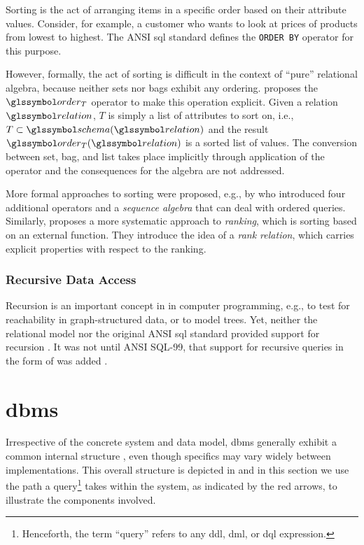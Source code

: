 Sorting is the act of arranging items in a specific order based on their attribute values. Consider, for example, a customer who wants to look at prices of products from lowest to highest. The ANSI \acrshort{sql} standard \cite{XOpen:1996SQL} defines the \texttt{ORDER BY} operator for this purpose.

However, formally, the act of sorting is difficult in the context of ``pure'' relational algebra, because neither sets nor bags exhibit any ordering. \cite{Garcia:2009Database} proposes the $\order_T$ operator to make this operation explicit. Given a relation $\relation$, $T$ is simply a list of attributes to sort on, i.e., $T \subset \schema(\relation)$ and the result $\order_T (\relation)$ is a sorted list of values. The conversion between set, bag, and list takes place implicitly through application of the operator and the consequences for the algebra are not addressed.

More formal approaches to sorting were proposed, e.g., by \cite{Ramakrsihnan:1998SRQL} who introduced four additional operators and a \emph{sequence algebra} that can deal with ordered queries. Similarly, \cite{Chengkai:2005RankSQL} proposes a more systematic approach to \emph{ranking}, which is sorting based on an external function. They introduce the idea of a \emph{rank relation}, which carries explicit properties with respect to the ranking.

\subsubsection{Recursive Data Access}

Recursion is an important concept in in computer programming, e.g., to test for reachability in graph-structured data, or to model trees. Yet, neither the relational model nor the original ANSI \acrshort{sql} \cite{XOpen:1996SQL} standard provided support for recursion \cite{Libkin:2003Expressive}. It was not until ANSI SQL-99, that support for recursive queries in the form of  was added \cite{Przymus:2010Recursive}.

\clearpage

\section{\texorpdfstring{\acrfull{dbms}}{Database Management System (DBMS)}}
Irrespective of the concrete system and data model, \acrshort{dbms} generally exhibit a common internal structure \cite{Petrov:2019Database,Hellerstein:2007Architecture}, even though specifics may vary widely between implementations. This overall structure is depicted in  and in this section we use the path a query\footnote{Henceforth, the term ``query'' refers to any \acrshort{ddl}, \acrshort{dml}, or \acrshort{dql} expression.} takes within the system, as indicated by the red arrows, to illustrate the components involved.

